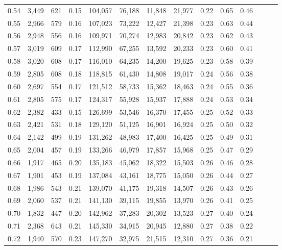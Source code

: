\begin{tabular}{rrrrrrrrrrrrrr}
0.54 &  3,449 &    621 &  0.15 &  104,057 &   76,188 &  11,848 &  21,977 &  0.22 &  0.65 &      0.46 \\
0.55 &  2,966 &    579 &  0.16 &  107,023 &   73,222 &  12,427 &  21,398 &  0.23 &  0.63 &      0.44 \\
0.56 &  2,948 &    556 &  0.16 &  109,971 &   70,274 &  12,983 &  20,842 &  0.23 &  0.62 &      0.43 \\
0.57 &  3,019 &    609 &  0.17 &  112,990 &   67,255 &  13,592 &  20,233 &  0.23 &  0.60 &      0.41 \\
0.58 &  3,020 &    608 &  0.17 &  116,010 &   64,235 &  14,200 &  19,625 &  0.23 &  0.58 &      0.39 \\
0.59 &  2,805 &    608 &  0.18 &  118,815 &   61,430 &  14,808 &  19,017 &  0.24 &  0.56 &      0.38 \\
0.60 &  2,697 &    554 &  0.17 &  121,512 &   58,733 &  15,362 &  18,463 &  0.24 &  0.55 &      0.36 \\
0.61 &  2,805 &    575 &  0.17 &  124,317 &   55,928 &  15,937 &  17,888 &  0.24 &  0.53 &      0.34 \\
0.62 &  2,382 &    433 &  0.15 &  126,699 &   53,546 &  16,370 &  17,455 &  0.25 &  0.52 &      0.33 \\
0.63 &  2,421 &    531 &  0.18 &  129,120 &   51,125 &  16,901 &  16,924 &  0.25 &  0.50 &      0.32 \\
0.64 &  2,142 &    499 &  0.19 &  131,262 &   48,983 &  17,400 &  16,425 &  0.25 &  0.49 &      0.31 \\
0.65 &  2,004 &    457 &  0.19 &  133,266 &   46,979 &  17,857 &  15,968 &  0.25 &  0.47 &      0.29 \\
0.66 &  1,917 &    465 &  0.20 &  135,183 &   45,062 &  18,322 &  15,503 &  0.26 &  0.46 &      0.28 \\
0.67 &  1,901 &    453 &  0.19 &  137,084 &   43,161 &  18,775 &  15,050 &  0.26 &  0.44 &      0.27 \\
0.68 &  1,986 &    543 &  0.21 &  139,070 &   41,175 &  19,318 &  14,507 &  0.26 &  0.43 &      0.26 \\
0.69 &  2,060 &    537 &  0.21 &  141,130 &   39,115 &  19,855 &  13,970 &  0.26 &  0.41 &      0.25 \\
0.70 &  1,832 &    447 &  0.20 &  142,962 &   37,283 &  20,302 &  13,523 &  0.27 &  0.40 &      0.24 \\
0.71 &  2,368 &    643 &  0.21 &  145,330 &   34,915 &  20,945 &  12,880 &  0.27 &  0.38 &      0.22 \\
0.72 &  1,940 &    570 &  0.23 &  147,270 &   32,975 &  21,515 &  12,310 &  0.27 &  0.36 &      0.21 \\

\end{tabular}
